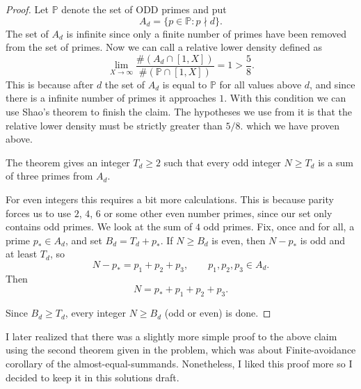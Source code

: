 \documentclass[11pt]{scrartcl}
\begin{document}
\begin{soln}
    \begin{proof}

        Let $\mathbb P$ denote the set of ODD primes and put
        \[
        A_d=\{p\in\mathbb P:p\nmid d\}.
        \]
		The set of $A_d$ is infinite since only a finite number 
		of primes have been removed from the set of primes. Now we can 
		call a relative lower density defined as 
        \[
        \lim_{X\to\infty}
        \frac{\#(A_d\cap[1,X])}{\#(\mathbb P\cap[1,X])}
        =1>\frac58.
        \]
		This is because after  $d$ the set of $A_d$ is equal to $\mathbb P$ 
		for all values above $d$, and since there is a infinite number of primes it approaches 
		$1$. With 
		this condition 
		we can use Shao's theorem \cite[Theorem~1.1]{p7-shao-density} to finish the claim.
        The hypotheses we use from it is that the relative lower density must be strictly greater than $5/8$.
        which we have proven above. 

        \begin{subproof}
            The theorem gives an integer $T_d\ge2$ such that
            every odd integer $N\ge T_d$ is a sum of three
            primes from $A_d$.
        \end{subproof}

        \begin{subproof}
			For even integers this requires a bit more calculations. This is 
			because parity forces us to use $2$, $4$, $6$ or some other even
			number  primes, since our set only 
			contains odd primes. We look at the sum of $4$ odd primes.
            Fix, once and for all, a prime $p_*\in A_d$,
and set $B_d=T_d+p_*$. If $N\ge B_d$ is even, then $N-p_*$ is odd
and at least $T_d$, so 
            \[
            N-p_*=p_1+p_2+p_3,
            \qquad p_1,p_2,p_3\in A_d.
            \]
            Then 
            \[
            N=p_*+p_1+p_2+p_3.
            \]
        \end{subproof}

     
        Since $B_d\ge T_d$, every integer $N\ge B_d$ (odd or even) is
done.
    \end{proof}
    \begin{remark}
        I later realized that there was a slightly more simple proof to the above
        claim using the 
        second theorem given in the problem, which was about Finite-avoidance corollary of the almost-equal-summands. Nonetheless, I liked this proof more so I decided
        to keep it in this solutions draft.

    \end{remark}


\end{soln}
\end{document}
